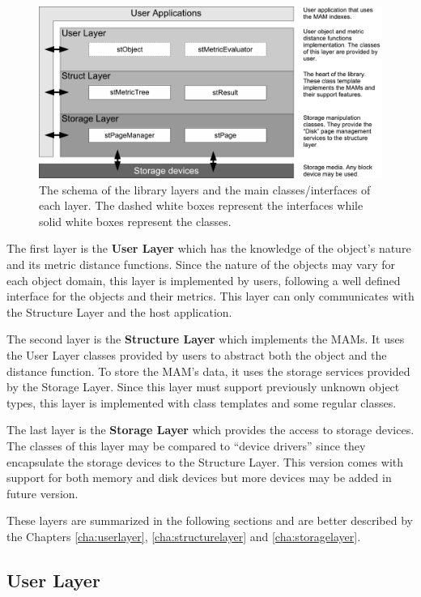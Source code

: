 \begin{figure}[tb]
	\centering
	\includegraphics[width=16cm]{layers.pdf}
	\caption{The schema of the library layers and the main classes/interfaces of each layer. The dashed white boxes represent the interfaces while solid white boxes represent the classes.}
	\label{fig:arch.layers}
\end{figure}

The first layer is the {\bf User Layer} which has the knowledge of the object's nature and its metric distance functions. Since the nature of the objects may vary for each object domain, this layer is implemented by users, following a well defined interface for the objects and their metrics. This layer can only communicates with the Structure Layer and the host application.

The second layer is the {\bf Structure Layer} which implements the MAMs. It uses the User Layer classes provided by users to abstract both the object and the distance function. To store the MAM's data, it uses the storage services provided by the Storage Layer. Since this layer must support previously unknown object types, this layer is implemented with class templates and some regular classes.

The last layer is the {\bf Storage Layer} which provides the access to storage devices. The classes of this layer may be compared to ``device drivers'' since they encapsulate the storage devices to the Structure Layer. This version comes with support for both memory and disk devices but more devices may be added in future version.

These layers are summarized in the following sections and are better described by the Chapters  \ref{cha:userlayer},  \ref{cha:structurelayer} and \ref{cha:storagelayer}.

\subsection{User Layer}
\label{sec:arch.user}

